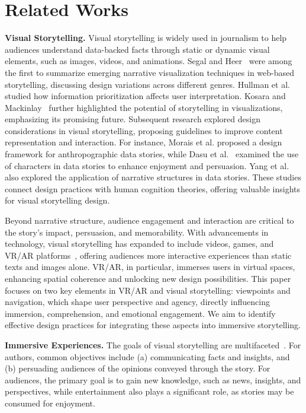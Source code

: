 \section{Related Works}
\noindent\textbf{Visual Storytelling.}
Visual storytelling is widely used in journalism to help audiences understand data-backed facts through static or dynamic visual elements, such as images, videos, and animations.
Segal and Heer~\cite{segel2010narrative} were among the first to summarize emerging narrative visualization techniques in web-based storytelling, discussing design variations across different genres.
Hullman et al.~\cite{hullman2011visualization} studied how information prioritization affects user interpretation. Kosara and Mackinlay~\cite{kosara2013storytelling} further highlighted the potential of storytelling in visualizations, emphasizing its promising future.
Subsequent research explored design considerations in visual storytelling, proposing guidelines to improve content representation and interaction. For instance, Morais et al.\cite{morais2020showing} proposed a design framework for anthropographic data stories, while Dasu et al.~\cite{dasu2023character} examined the use of characters in data stories to enhance enjoyment and persuasion. Yang et al.~\cite{yang2021design} also explored the application of narrative structures in data stories. These studies connect design practices with human cognition theories, offering valuable insights for visual storytelling design.

Beyond narrative structure, audience engagement and interaction are critical to the story’s impact, persuasion, and memorability.
With advancements in technology, visual storytelling has expanded to include videos, games, and VR/AR platforms~\cite{zhao2023stories,mendez2025immersive,zhou2023data}, offering audiences more interactive experiences than static texts and images alone. VR/AR, in particular, immerses users in virtual spaces, enhancing spatial coherence and unlocking new design possibilities.
This paper focuses on two key elements in VR/AR and visual storytelling: viewpoints and navigation, which shape user perspective and agency, directly influencing immersion, comprehension, and emotional engagement. We aim to identify effective design practices for integrating these aspects into immersive storytelling.

\noindent\textbf{Immersive Experiences.}
The goals of visual storytelling are multifaceted~\cite{amini2018evaluating}. For authors, common objectives include (a) communicating facts and insights, and (b) persuading audiences of the opinions conveyed through the story. For audiences, the primary goal is to gain new knowledge, such as news, insights, and perspectives, while entertainment also plays a significant role, as stories may be consumed for enjoyment.

